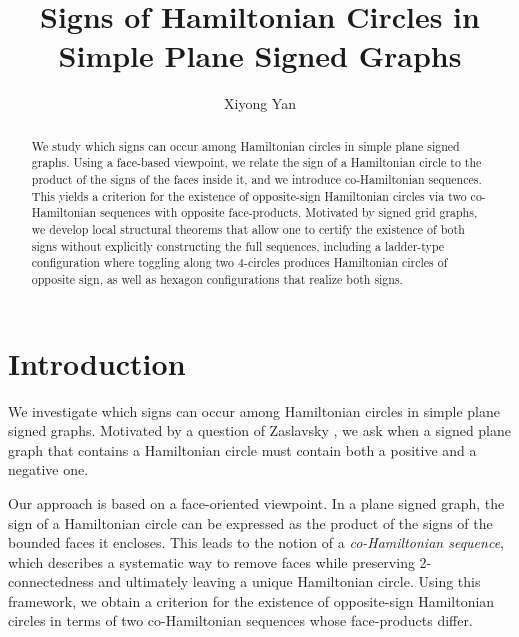\documentclass[12pt]{amsart}
\theoremstyle{theorem}%
\theoremstyle{definition}%
\begin{document}
\title[Signs of Hamiltonian Circles in  Simple Plane Signed Graphs]{Signs of Hamiltonian Circles in  Simple Plane Signed Graphs}

\author{Xiyong Yan}
\address{89 Park Ave Apt 29,  Binghamton, NY,  USA,  13903.}


\begin{abstract}
We study which signs can occur among Hamiltonian circles in  simple plane signed graphs.  Using a face-based viewpoint, we relate the sign of a Hamiltonian
circle to the product of the signs of the faces inside it, and we introduce co-Hamiltonian sequences.
This yields a criterion for the existence of opposite-sign Hamiltonian circles via two co-Hamiltonian sequences
with opposite face-products.  Motivated by signed grid graphs, we develop local structural theorems that allow one
to certify the existence of both signs without explicitly constructing the full sequences, including a ladder-type
configuration where toggling along two $4$-circles produces Hamiltonian circles of opposite sign,  as well as hexagon configurations that realize both signs.



\end{abstract}

\maketitle

\section{Introduction}

We investigate which signs can occur among Hamiltonian circles in simple plane signed graphs. Motivated by a question of Zaslavsky \cite{1}, we ask when a signed plane graph that contains a Hamiltonian circle must contain both a positive and a negative one.

Our approach is based on a face-oriented viewpoint. In a plane signed graph, the sign of a Hamiltonian circle can be expressed as the product of the signs of the bounded faces it encloses. This leads to the notion of a \emph{co-Hamiltonian sequence}, which describes a systematic way to remove faces while preserving 2-connectedness and ultimately leaving a unique Hamiltonian circle. Using this framework, we obtain a criterion for the existence of opposite-sign Hamiltonian circles in terms of two co-Hamiltonian sequences whose face-products differ.
\end{document}
